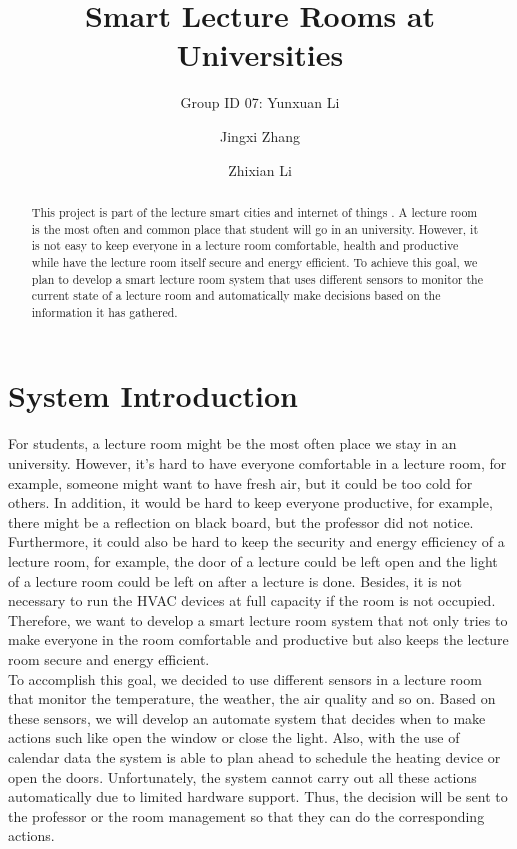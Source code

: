 \documentclass[runningheads]{llncs}
\begin{document}
%
\title{Smart Lecture Rooms at Universities}

\author{Group ID 07: Yunxuan Li \and
Jingxi Zhang \and
Zhixian Li}

%
\maketitle              %
%
\begin{abstract}
This project is part of the lecture smart cities and internet of things \cite{ref_url1}. A lecture room is the most often and common place that student will go in an university. However, it is not easy to keep everyone in a lecture room comfortable, health and productive while have the lecture room itself secure and energy efficient. To achieve this goal, we plan to develop a smart lecture room system that uses different sensors to monitor the current state of a lecture room and automatically make decisions based on the information it has gathered.

\end{abstract}
%
%
%
\section{System Introduction}
For students, a lecture room might be the most often place we stay in an university. However, it’s hard to have everyone comfortable in a lecture room, for example, someone might want to have fresh air, but it could be too cold for others. In addition, it would be hard to keep everyone productive, for example, there might be a reflection on black board, but the professor did not notice. Furthermore, it could also be hard to keep the security and energy efficiency of a lecture room, for example, the door of a lecture could be left open and the light of a lecture room could be left on after a lecture is done. Besides, it is not necessary to run the HVAC devices at full capacity if the room is not occupied. Therefore, we want to develop a smart lecture room system that not only tries to make everyone in the room comfortable and productive but also keeps the lecture room secure and energy efficient. \\
To accomplish this goal, we decided to use different sensors in a lecture room that monitor the temperature, the weather, the air quality and so on. Based on these sensors, we will develop an automate system that decides when to make actions such like open the window or close the light. Also, with the use of calendar data the system is able to plan ahead to schedule the heating device or open the doors. Unfortunately, the system cannot carry out all these actions automatically due to limited hardware support. Thus, the decision will be sent to the professor or the room management so that they can do the corresponding actions.
\end{document}
